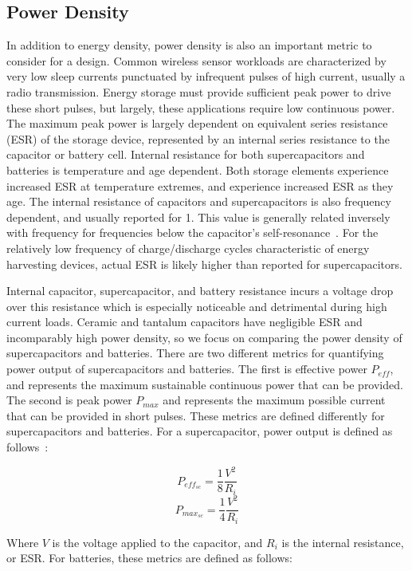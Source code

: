 
\subsection{Power Density}
In addition to energy density, power density is also an important metric to consider for a design. 
Common wireless sensor workloads are characterized by very low sleep currents punctuated by infrequent pulses of high current, usually a radio transmission. Energy storage must provide sufficient peak power to drive these short pulses, but largely, these applications require low continuous power. The maximum peak power is largely dependent on equivalent series resistance (ESR) of the storage device, represented by an internal series resistance to the capacitor or battery cell. 
Internal resistance for both supercapacitors and batteries is temperature and age dependent. Both storage elements experience increased ESR at temperature extremes, and experience increased ESR as they age.
The internal resistance of capacitors and supercapacitors is also frequency dependent, and usually reported for 1\ssi{\kilo\hertz}. This value is generally related inversely with frequency for frequencies below the capacitor's self-resonance~\cite{murataESRArticle}. For the relatively low frequency of charge/discharge cycles characteristic of energy harvesting devices, actual ESR is likely higher than reported for supercapacitors.

Internal capacitor, supercapacitor, and battery resistance incurs a voltage drop over this resistance which is especially noticeable and detrimental during high  current loads.
Ceramic and tantalum capacitors have negligible ESR and incomparably high power density, so we focus on comparing the power density of supercapacitors and batteries.
There are two different metrics for quantifying power output of supercapacitors and batteries. The first is effective power $P_{eff}$, and represents the maximum sustainable continuous power that can be provided. The second is peak power $P_{max}$ and represents the maximum possible current that can be provided in short pulses. These metrics are defined differently for supercapacitors and batteries. For a supercapacitor, power output is defined as follows~\cite{IEC62391}:

$$P_{eff_{sc}} = \frac{1}{8} \frac{V^2}{R_i}$$
$$P_{max_{sc}} = \frac{1}{4} \frac{V^2}{R_i}$$

\noindent Where $V$ is the voltage applied to the capacitor, and $R_i$ is the internal resistance, or ESR. For batteries, these metrics are defined as follows:

